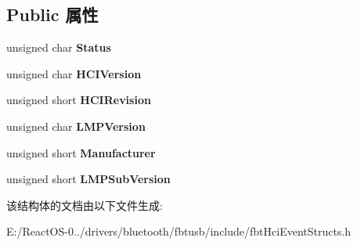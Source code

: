 \subsection*{Public 属性}
\begin{DoxyCompactItemize}
\item 
\mbox{\label{struct_f_b_t___h_c_i___r_e_a_d___l_o_c_a_l___v_e_r_s_i_o_n___i_n_f_o_r_m_a_t_i_o_n___c_o_m_p_l_e_t_e_ae910b8d35ec81a487be79c613bf5d142}} 
unsigned char {\bfseries Status}
\item 
\mbox{\label{struct_f_b_t___h_c_i___r_e_a_d___l_o_c_a_l___v_e_r_s_i_o_n___i_n_f_o_r_m_a_t_i_o_n___c_o_m_p_l_e_t_e_a1221e76cf06b52053097e2612962a2b9}} 
unsigned char {\bfseries H\+C\+I\+Version}
\item 
\mbox{\label{struct_f_b_t___h_c_i___r_e_a_d___l_o_c_a_l___v_e_r_s_i_o_n___i_n_f_o_r_m_a_t_i_o_n___c_o_m_p_l_e_t_e_ad2c0b8ef9a43c83b950e2677d0139e09}} 
unsigned short {\bfseries H\+C\+I\+Revision}
\item 
\mbox{\label{struct_f_b_t___h_c_i___r_e_a_d___l_o_c_a_l___v_e_r_s_i_o_n___i_n_f_o_r_m_a_t_i_o_n___c_o_m_p_l_e_t_e_a6466451bf31156dc1e0cca8d1f14364f}} 
unsigned char {\bfseries L\+M\+P\+Version}
\item 
\mbox{\label{struct_f_b_t___h_c_i___r_e_a_d___l_o_c_a_l___v_e_r_s_i_o_n___i_n_f_o_r_m_a_t_i_o_n___c_o_m_p_l_e_t_e_af1200400f80327210f223f0fe7856487}} 
unsigned short {\bfseries Manufacturer}
\item 
\mbox{\label{struct_f_b_t___h_c_i___r_e_a_d___l_o_c_a_l___v_e_r_s_i_o_n___i_n_f_o_r_m_a_t_i_o_n___c_o_m_p_l_e_t_e_aaf5e9c0a552affd3825be1c0e1c29dc8}} 
unsigned short {\bfseries L\+M\+P\+Sub\+Version}
\end{DoxyCompactItemize}


该结构体的文档由以下文件生成\+:\begin{DoxyCompactItemize}
\item 
E\+:/\+React\+O\+S-\/0../drivers/bluetooth/fbtusb/include/fbt\+Hci\+Event\+Structs.\+h\end{DoxyCompactItemize}
